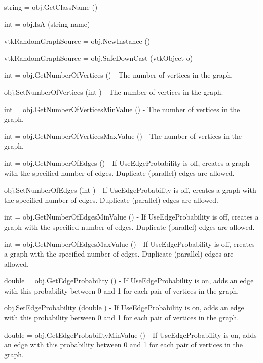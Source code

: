\begin{DoxyItemize}
\item {\ttfamily string = obj.\-Get\-Class\-Name ()}  
\item {\ttfamily int = obj.\-Is\-A (string name)}  
\item {\ttfamily vtk\-Random\-Graph\-Source = obj.\-New\-Instance ()}  
\item {\ttfamily vtk\-Random\-Graph\-Source = obj.\-Safe\-Down\-Cast (vtk\-Object o)}  
\item {\ttfamily int = obj.\-Get\-Number\-Of\-Vertices ()} -\/ The number of vertices in the graph.  
\item {\ttfamily obj.\-Set\-Number\-Of\-Vertices (int )} -\/ The number of vertices in the graph.  
\item {\ttfamily int = obj.\-Get\-Number\-Of\-Vertices\-Min\-Value ()} -\/ The number of vertices in the graph.  
\item {\ttfamily int = obj.\-Get\-Number\-Of\-Vertices\-Max\-Value ()} -\/ The number of vertices in the graph.  
\item {\ttfamily int = obj.\-Get\-Number\-Of\-Edges ()} -\/ If Use\-Edge\-Probability is off, creates a graph with the specified number of edges. Duplicate (parallel) edges are allowed.  
\item {\ttfamily obj.\-Set\-Number\-Of\-Edges (int )} -\/ If Use\-Edge\-Probability is off, creates a graph with the specified number of edges. Duplicate (parallel) edges are allowed.  
\item {\ttfamily int = obj.\-Get\-Number\-Of\-Edges\-Min\-Value ()} -\/ If Use\-Edge\-Probability is off, creates a graph with the specified number of edges. Duplicate (parallel) edges are allowed.  
\item {\ttfamily int = obj.\-Get\-Number\-Of\-Edges\-Max\-Value ()} -\/ If Use\-Edge\-Probability is off, creates a graph with the specified number of edges. Duplicate (parallel) edges are allowed.  
\item {\ttfamily double = obj.\-Get\-Edge\-Probability ()} -\/ If Use\-Edge\-Probability is on, adds an edge with this probability between 0 and 1 for each pair of vertices in the graph.  
\item {\ttfamily obj.\-Set\-Edge\-Probability (double )} -\/ If Use\-Edge\-Probability is on, adds an edge with this probability between 0 and 1 for each pair of vertices in the graph.  
\item {\ttfamily double = obj.\-Get\-Edge\-Probability\-Min\-Value ()} -\/ If Use\-Edge\-Probability is on, adds an edge with this probability between 0 and 1 for each pair of vertices in the graph.  

\end{DoxyItemize}
